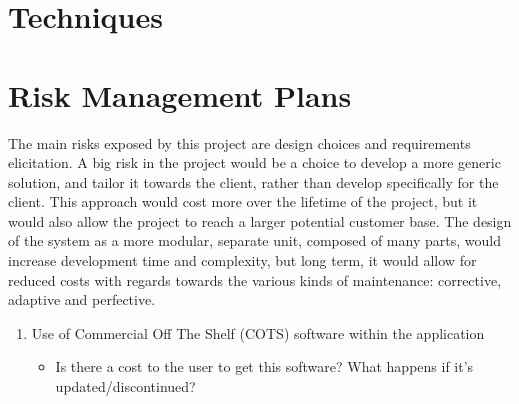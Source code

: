 \section{Techniques}

\section{Risk Management Plans}

The main risks exposed by this project are design choices and requirements elicitation. A big risk in the project would be a choice to develop a more generic solution, and tailor it towards the client, rather than develop specifically for the client. This approach would cost more over the lifetime of the project, but it would also allow the project to reach a larger potential customer base. The design of the system as a more modular, separate unit, composed of many parts, would increase development time and complexity, but long term, it would allow for reduced costs with regards towards the various kinds of maintenance: corrective, adaptive and perfective. 

\begin{enumerate}
\item Use of Commercial Off The Shelf (COTS) software within the application
\begin{itemize}
\item Is there a cost to the user to get this software? What happens if it's updated/discontinued?
\end{itemize}

\end{enumerate}